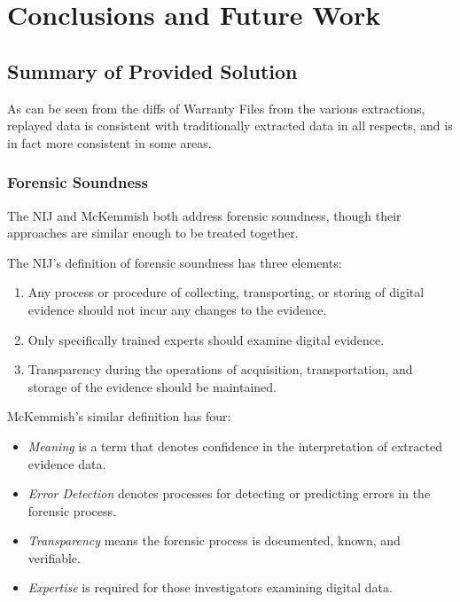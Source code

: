 \chapter{Conclusions and Future Work}

\section{Summary of Provided Solution}

As can be seen from the diffs of Warranty Files from the various extractions, replayed data is consistent with
traditionally extracted data in all respects, and is in fact more consistent in some areas.

\subsection{Forensic Soundness}


The NIJ and McKemmish both address forensic soundness, though their approaches are similar enough to be
treated together.

The NIJ's definition of forensic soundness has three elements:

\begin{enumerate}
  \item Any process or procedure of collecting, transporting, or storing of digital evidence should not incur any changes to the evidence.
  \item Only specifically trained experts should examine digital evidence.
  \item Transparency during the operations of acquisition, transportation, and storage of the evidence should be maintained.
\end{enumerate}

McKemmish's similar definition has four:

\begin{itemize}
\item \emph{Meaning} is a term that denotes confidence in the interpretation of extracted evidence data.
\item \emph{Error Detection} denotes processes for detecting or predicting errors in the forensic process.
\item \emph{Transparency} means the forensic process is documented, known, and verifiable.
\item \emph{Expertise} is required for those investigators examining digital data.
\end{itemize}

